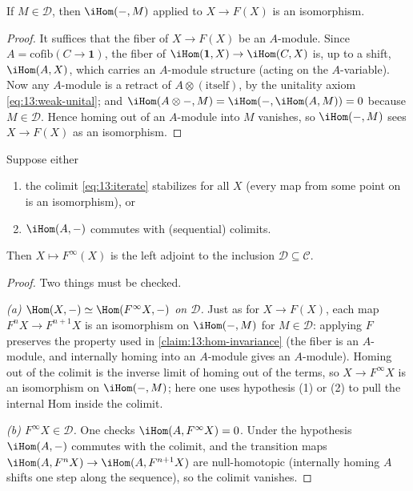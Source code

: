 \begin{claim}
\label{claim:13:hom-invariance}
If $M\in\mathcal D$, then $\iHom(-,M)$ applied to $X\to F(X)$ is an isomorphism.
\end{claim}

\begin{proof}
It suffices that the fiber of $X\to F(X)$ be an $A$-module. Since
$A=\mathrm{cofib}(C\to\mathbf 1)$, the fiber of
$\iHom(\mathbf 1,X)\to\iHom(C,X)$ is, up to a shift, $\iHom(A,X)$, which carries
an $A$-module structure (acting on the $A$-variable). Now any $A$-module is a
retract of $A\otimes(\text{itself})$, by the unitality axiom
\eqref{eq:13:weak-unital}; and $\iHom(A\otimes-,M)=\iHom(-,\iHom(A,M))=0$ because
$M\in\mathcal D$. Hence homing out of an $A$-module into $M$ vanishes, so
$\iHom(-,M)$ sees $X\to F(X)$ as an isomorphism.
\end{proof}

\begin{proposition}
\label{prop:13:left-adjoint}
Suppose either
\begin{enumerate}
\item the colimit \eqref{eq:13:iterate} stabilizes for all $X$ (every map from
some point on is an isomorphism), or
\item $\iHom(A,-)$ commutes with (sequential) colimits.
\end{enumerate}
Then $X\mapsto F^\infty(X)$ is the left adjoint to the inclusion
$\mathcal D\subseteq\mathcal C$.
\end{proposition}

\begin{proof}
Two things must be checked.

\emph{(a) $\Hom(X,-)\simeq\Hom(F^\infty X,-)$ on $\mathcal D$.} Just as for
$X\to F(X)$, each map $F^n X\to F^{n+1}X$ is an isomorphism on $\iHom(-,M)$ for
$M\in\mathcal D$: applying $F$ preserves the property used in
\cref{claim:13:hom-invariance} (the fiber is an $A$-module, and internally homing
into an $A$-module gives an $A$-module). Homing out of the colimit is the inverse
limit of homing out of the terms, so $X\to F^\infty X$ is an isomorphism on
$\iHom(-,M)$; here one uses hypothesis (1) or (2) to pull the internal Hom inside
the colimit.

\emph{(b) $F^\infty X\in\mathcal D$.} One checks $\iHom(A,F^\infty X)=0$. Under
the hypothesis $\iHom(A,-)$ commutes with the colimit, and the transition maps
$\iHom(A,F^n X)\to\iHom(A,F^{n+1}X)$ are null-homotopic (internally homing $A$
shifts one step along the sequence), so the colimit vanishes.
\end{proof}

